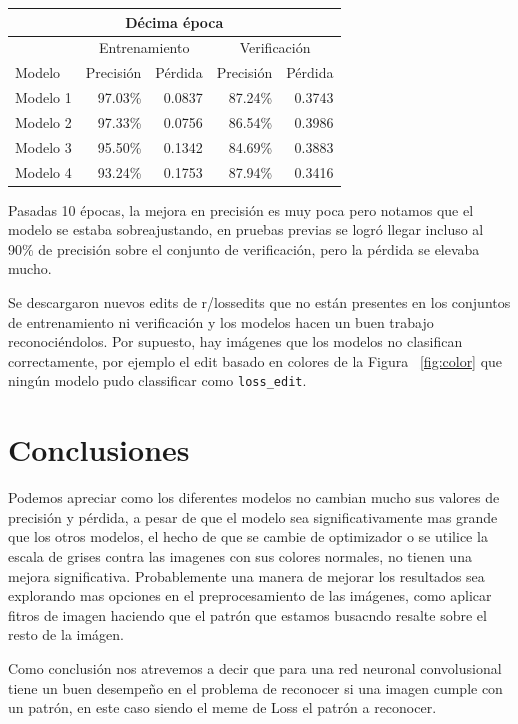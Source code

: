 \documentclass[spanish,11pt,letterpaper]{article}
\begin{document}
\begin{center}
\begin{tabular}{|l||r|r|r|r|}
\hline
\multicolumn{5}{|c|}{Décima época}
\\ \hline
& \multicolumn{2}{|c|}{Entrenamiento} & \multicolumn{2}{|c|}{Verificación}
\\ \hline
Modelo & Precisión & Pérdida & Precisión & Pérdida
\\ \hline
Modelo 1 & 97.03\% & 0.0837 & 87.24\% & 0.3743\\
Modelo 2 & 97.33\% & 0.0756 & 86.54\% & 0.3986\\
Modelo 3 & 95.50\% & 0.1342 & 84.69\% & 0.3883\\
Modelo 4 & 93.24\% & 0.1753 & 87.94\% & 0.3416\\
\hline
\end{tabular}
\end{center}

Pasadas 10 épocas, la mejora en precisión es muy poca pero notamos que el modelo
se estaba sobreajustando, en pruebas previas se logró
llegar incluso al 90\% de precisión sobre el conjunto de verificación, pero la
pérdida se elevaba mucho.

Se descargaron nuevos edits de \textsf{r/lossedits} que no están presentes en
los conjuntos de entrenamiento ni verificación y los modelos hacen un buen trabajo
reconociéndolos. Por supuesto, hay imágenes que los modelos no clasifican
correctamente, por ejemplo el edit basado en colores de la Figura ~\ref{fig:color}
que ningún modelo pudo classificar como \texttt{loss\_edit}.

\section{Conclusiones}

Podemos apreciar como los diferentes modelos no cambian mucho sus valores de precisión y pérdida, a pesar
de que el modelo sea significativamente mas grande que los otros modelos, el hecho de que se cambie de
optimizador o se utilice la escala de grises contra las imagenes con sus colores normales, no tienen una mejora
significativa. Probablemente una manera de mejorar los resultados sea explorando mas opciones en el preprocesamiento
de las imágenes, como aplicar fitros de imagen haciendo que el patrón que estamos busacndo resalte sobre el resto de la imágen.

Como conclusión nos atrevemos a decir que para una red neuronal convolusional tiene un buen desempeño en el
problema de reconocer si una imagen cumple con un patrón, en este caso siendo el meme de Loss el patrón a
reconocer.
\end{document}
